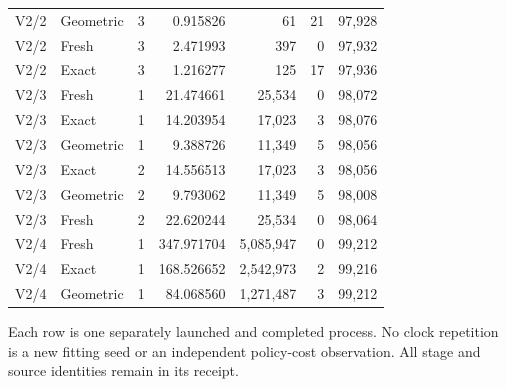\begin{longtable}{llrrrrr}
V2/2 & Geometric & 3 & 0.915826 & 61 & 21 & 97,928 \\
V2/2 & Fresh & 3 & 2.471993 & 397 & 0 & 97,932 \\
V2/2 & Exact & 3 & 1.216277 & 125 & 17 & 97,936 \\
V2/3 & Fresh & 1 & 21.474661 & 25,534 & 0 & 98,072 \\
V2/3 & Exact & 1 & 14.203954 & 17,023 & 3 & 98,076 \\
V2/3 & Geometric & 1 & 9.388726 & 11,349 & 5 & 98,056 \\
V2/3 & Exact & 2 & 14.556513 & 17,023 & 3 & 98,056 \\
V2/3 & Geometric & 2 & 9.793062 & 11,349 & 5 & 98,008 \\
V2/3 & Fresh & 2 & 22.620244 & 25,534 & 0 & 98,064 \\
V2/4 & Fresh & 1 & 347.971704 & 5,085,947 & 0 & 99,212 \\
V2/4 & Exact & 1 & 168.526652 & 2,542,973 & 2 & 99,216 \\
V2/4 & Geometric & 1 & 84.068560 & 1,271,487 & 3 & 99,212 \\
\hline
\end{longtable}\endgroup
{\footnotesize Each row is one separately launched and completed process. No clock repetition is a new fitting seed or an independent policy-cost observation. All stage and source identities remain in its receipt.}
